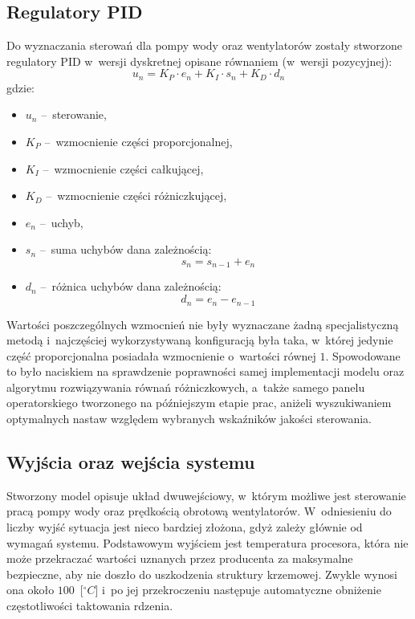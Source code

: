 \newpage
\subsection{Regulatory PID}
\indent

Do wyznaczania sterowań dla pompy wody oraz wentylatorów zostały stworzone
regulatory PID w~wersji dyskretnej opisane równaniem (w~wersji pozycyjnej):
\begin{equation}
    u_n = K_P \cdot e_n + K_I \cdot s_n + K_D \cdot d_n
    \label{equ:reg}
\end{equation}
gdzie:
\begin{itemize}
    \item $u_n$ --~sterowanie,
    \item $K_P$ --~wzmocnienie części proporcjonalnej,
    \item $K_I$ --~wzmocnienie części całkującej,
    \item $K_D$ --~wzmocnienie części różniczkującej,
    \item $e_n$ --~uchyb,
    \item $s_n$ --~suma uchybów dana zależnością:
        \begin{equation}
            s_n = s_{n - 1} + e_n
        \end{equation}
    \item $d_n$ --~różnica uchybów dana zależnością:
        \begin{equation}
            d_n = e_n - e_{n - 1}
        \end{equation}
\end{itemize}

Wartości poszczególnych wzmocnień nie były wyznaczane żadną specjalistyczną
metodą i~najczęściej wykorzystywaną konfiguracją była taka, w~której jedynie
część proporcjonalna posiadała wzmocnienie o~wartości równej $1$. Spowodowane to
było naciskiem na sprawdzenie poprawności samej implementacji modelu oraz
algorytmu rozwiązywania równań różniczkowych, a~także samego panelu
operatorskiego tworzonego na późniejszym etapie prac, aniżeli wyszukiwaniem
optymalnych nastaw względem wybranych wskaźników jakości sterowania.

\subsection{Wyjścia oraz wejścia systemu}
\indent

Stworzony model opisuje układ dwuwejściowy, w~którym możliwe jest sterowanie
pracą pompy wody oraz prędkością obrotową wentylatorów. W~odniesieniu do liczby
wyjść sytuacja jest nieco bardziej złożona, gdyż zależy głównie od wymagań
systemu. Podstawowym wyjściem jest temperatura procesora, która nie może
przekraczać wartości uznanych przez producenta za maksymalne bezpieczne, aby nie
doszło do uszkodzenia struktury krzemowej. Zwykle wynosi ona około
$100$~[$^\circ C$] i~po jej przekroczeniu następuje automatyczne obniżenie
częstotliwości taktowania rdzenia.

